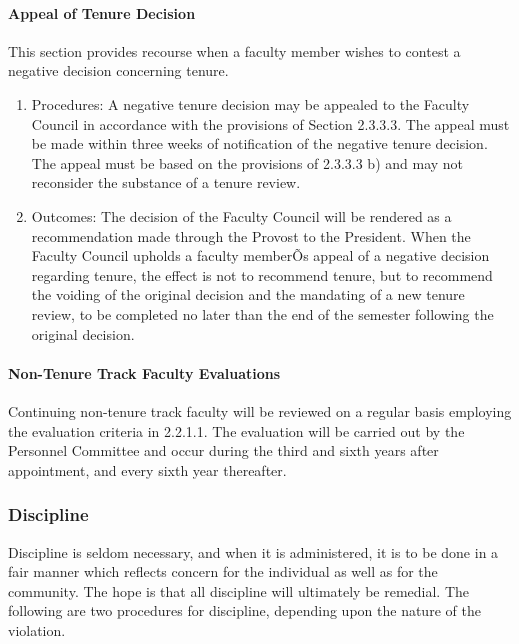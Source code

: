 \documentclass[letterpaper, 11pt]{article}
\begin{document}
			\paragraph{Appeal of Tenure Decision}
				This section provides recourse when a faculty member wishes to contest a negative decision concerning tenure.
				\begin{enumerate}[label=\alph*)]
					\item{Procedures:}
					A negative tenure decision may be appealed to the Faculty Council in accordance with the provisions of Section 2.3.3.3.  The appeal must be made within three weeks of notification of the negative tenure decision.  The appeal must be based on the provisions of 2.3.3.3 b) and may not reconsider the substance of a tenure review.
					\item{Outcomes:}
					The decision of the Faculty Council will be rendered as a recommendation made through the Provost to the President.  When the Faculty Council upholds a faculty memberÕs appeal of a negative decision regarding tenure, the effect is not to recommend tenure, but to recommend the voiding of the original decision and the mandating of a new tenure review, to be completed no later than the end of the semester following the original decision.
				\end{enumerate}
			\paragraph{Non-Tenure Track Faculty Evaluations}
				Continuing non-tenure track faculty will be reviewed on a regular basis employing the evaluation criteria in 2.2.1.1.  The evaluation will be carried out by the Personnel Committee and occur during the third and sixth years after appointment, and every sixth year thereafter.
		\subsubsection{Discipline}
			Discipline is seldom necessary, and when it is administered, it is to be done in a fair manner which reflects concern for the individual as well as for the community.  The hope is that all discipline will ultimately be remedial.  The following are two procedures for discipline, depending upon the nature of the violation.
\end{document}
